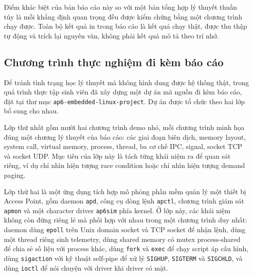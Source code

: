 \documentclass[11pt]{article}
\newcommand{\code}[1]{\texttt{#1}}
\begin{document}
Điểm khác biệt của bản báo cáo này so với một bản tổng hợp lý thuyết thuần túy là mỗi khẳng định quan trọng đều được kiểm chứng bằng một chương trình chạy được. Toàn bộ kết quả in trong báo cáo là kết quả chạy thật, được thu thập tự động và trích lại nguyên văn, không phải kết quả mô tả theo trí nhớ.

\subsection{Chương trình thực nghiệm đi kèm báo cáo}

Để tránh tình trạng học lý thuyết mà không hình dung được hệ thống thật, trong quá trình thực tập sinh viên đã xây dựng một dự án mã nguồn đi kèm báo cáo, đặt tại thư mục \code{ap6-embedded-linux-project}. Dự án được tổ chức theo hai lớp bổ sung cho nhau.

Lớp thứ nhất gồm mười hai chương trình demo nhỏ, mỗi chương trình minh họa đúng một chương lý thuyết của báo cáo: các giai đoạn biên dịch, memory layout, system call, virtual memory, process, thread, ba cơ chế IPC, signal, socket TCP và socket UDP. Mục tiêu của lớp này là tách từng khái niệm ra để quan sát riêng, ví dụ chỉ nhìn hiện tượng race condition hoặc chỉ nhìn hiện tượng demand paging.

Lớp thứ hai là một ứng dụng tích hợp mô phỏng phần mềm quản lý một thiết bị Access Point, gồm daemon \code{apd}, công cụ dòng lệnh \code{apctl}, chương trình giám sát \code{apmon} và một character driver \code{ap6sim} phía kernel. Ở lớp này, các khái niệm không còn đứng riêng lẻ mà phối hợp với nhau trong một chương trình duy nhất: daemon dùng \code{epoll} trên Unix domain socket và TCP socket để nhận lệnh, dùng một thread riêng sinh telemetry, dùng shared memory có mutex process-shared để chia sẻ số liệu với process khác, dùng \code{fork} và \code{exec} để chạy script áp cấu hình, dùng \code{sigaction} với kỹ thuật self-pipe để xử lý \code{SIGHUP}, \code{SIGTERM} và \code{SIGCHLD}, và dùng \code{ioctl} để nói chuyện với driver khi driver có mặt.
\end{document}
